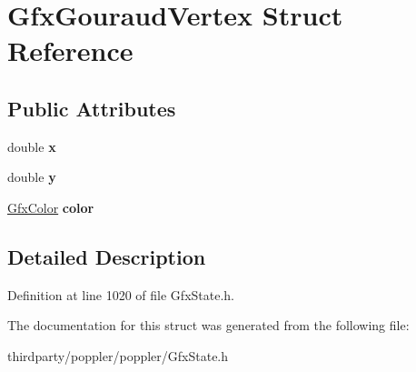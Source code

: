 \hypertarget{struct_gfx_gouraud_vertex}{}\section{Gfx\+Gouraud\+Vertex Struct Reference}
\label{struct_gfx_gouraud_vertex}
\subsection*{Public Attributes}
\begin{DoxyCompactItemize}
\item 
\mbox{\label{struct_gfx_gouraud_vertex_a76c73e46a496ce70b8330e0c4973e0e1}} 
double {\bfseries x}
\item 
\mbox{\label{struct_gfx_gouraud_vertex_a1131767925a3783bfa46f49e77354fd9}} 
double {\bfseries y}
\item 
\mbox{\label{struct_gfx_gouraud_vertex_a85828ee230da1116d3d75d2f6ca3ff2b}} 
\hyperlink{struct_gfx_color}{Gfx\+Color} {\bfseries color}
\end{DoxyCompactItemize}


\subsection{Detailed Description}


Definition at line 1020 of file Gfx\+State.\+h.



The documentation for this struct was generated from the following file\+:\begin{DoxyCompactItemize}
\item 
thirdparty/poppler/poppler/Gfx\+State.\+h\end{DoxyCompactItemize}
